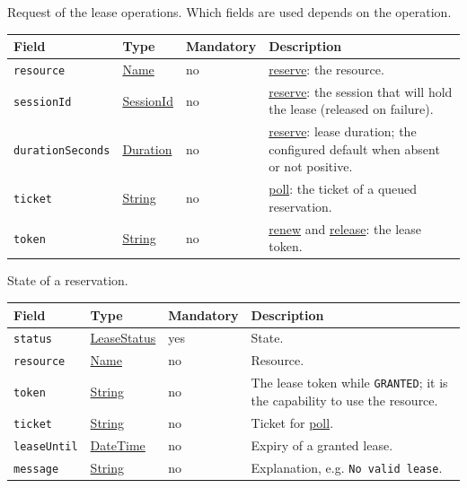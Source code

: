 \documentclass[a4paper]{arrowhead}
\newcommand{\mref}[1]{{\textcolor{ArrowheadPurple}{\hyperref[sec:model:#1]{#1}}}}
\newcommand{\oref}[1]{{\textcolor{ArrowheadBlue}{\hyperref[sec:operations:#1]{#1}}}}
\newcommand{\pref}[1]{{\textcolor{ArrowheadGrey}{\hyperref[sec:model:primitives:#1]{#1}}}}
\begin{document}
Request of the lease operations. Which fields are used depends on the operation.

{\small
\begin{longtable}{|p{3.7cm}|p{4.2cm}|p{1.6cm}|p{6.3cm}|}

\hline
\rowcolor{gray!33} Field & Type & Mandatory & Description \\ \hline
\endhead
\texttt{resource} & \pref{Name} & no & \oref{reserve}: the resource. \\ \hline
\texttt{sessionId} & \pref{SessionId} & no & \oref{reserve}: the session that will hold the lease (released on failure). \\ \hline
\texttt{durationSeconds} & \pref{Duration} & no & \oref{reserve}: lease duration; the configured default when absent or not positive. \\ \hline
\texttt{ticket} & \pref{String} & no & \oref{poll}: the ticket of a queued reservation. \\ \hline
\texttt{token} & \pref{String} & no & \oref{renew} and \oref{release}: the lease token. \\ \hline
\end{longtable}
}

State of a reservation.

{\small
\begin{longtable}{|p{3.7cm}|p{4.2cm}|p{1.6cm}|p{6.3cm}|}

\hline
\rowcolor{gray!33} Field & Type & Mandatory & Description \\ \hline
\endhead
\texttt{status} & \mref{LeaseStatus} & yes & State. \\ \hline
\texttt{resource} & \pref{Name} & no & Resource. \\ \hline
\texttt{token} & \pref{String} & no & The lease token while \texttt{GRANTED}; it is the capability to use the resource. \\ \hline
\texttt{ticket} & \pref{String} & no & Ticket for \oref{poll}. \\ \hline
\texttt{leaseUntil} & \pref{DateTime} & no & Expiry of a granted lease. \\ \hline
\texttt{message} & \pref{String} & no & Explanation, e.g. \texttt{No valid lease}. \\ \hline
\end{longtable}
}
\end{document}
